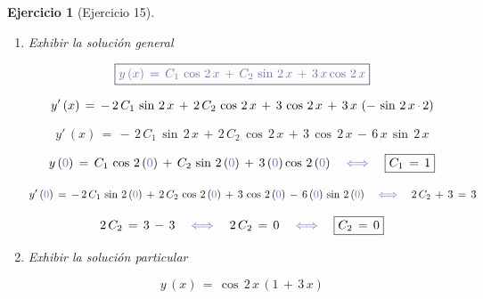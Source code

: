 \documentclass[a4paper,11pt, openany]{book}
\newtheorem{ejer}{Ejercicio}[section]
\newcommand*{\itembolasazules}[1]{%
\footnotesize\protect\tikz[baseline=-3pt]%
\protect\node[scale=.7, circle, shade, ball
color=green]{\color{white}\Large\bf#1};}
\begin{document}
\begin{ejer}[Ejercicio 15]
\begin{enumerate}[label=\itembolasazules{\arabic*}]
\begin{multline*}
4\,M\,\cos\,2\,x\,-\,4\,N\,\sin\,2\,x\,-\,\cancel{4\,M\,x\,\sin\,2\,x}\,-\,\cancel{4\,N\,x\,\cos\,2\,x}\,+\, \\
\cancel{4\,M\,x\,\sin\,2\,x}\,+\,\cancel{4\,N\,x\,\cos\,2\,x}\,=\,-\,12\,\sin\,2\,x    
\end{multline*}
 
$$4\,M\,=\,0 \quad \quad \textcolor{toolbox}{\iff} \quad \boxed{M\,=\,0}$$
 
$$-\,4\,N\,=\,-\,12 \quad \textcolor{toolbox}{\iff} \quad N\,=\,\dfrac{-\,12}{-\,4} \quad \textcolor{toolbox}{\iff} \quad \boxed{N\,=\,3}$$
 
\item Exhibir la solución general 
 
$$\boxed{\textcolor{toolbox}{y\,(x)\,=\,C_{1}\,\cos\,2\,x\,+\,C_{2}\,\sin\,2\,x\,+\,3\,x\cos\,2\,x} } $$
 
$$y'\,(x)\,=\,-\,2\,C_{1}\,\sin\,2\,x\,+\,2\,C_{2}\,\cos\,2\,x\,+\,3\,\cos\,2\,x\,+\,3\,x\,\left(-\,\sin\,2\,x\,\textcolor{toolbox}{\cdot}\,2 \right) $$
 
$$\boxed{y'\,(x)\,=\,-\,2\,C_{1}\,\sin\,2\,x\,+\,2\,C_{2}\,\cos\,2\,x\,+\,3\,\cos\,2\,x\,-\,6\,x\,\sin\,2\,x }$$
 
$$y\,(\textcolor{toolbox}{0})\,=\,C_{1}\,\cos\,2\,(\textcolor{toolbox}{0})\,+\,C_{2}\,\sin\,2\,(\textcolor{toolbox}{0})\,+\,3\,(\textcolor{toolbox}{0})\cos\,2\,(\textcolor{toolbox}{0}) \quad \textcolor{toolbox}{\iff} \quad \boxed{C_{1}\,=\,1}$$
 
$$y'\,(\textcolor{toolbox}{0})\,=\,-\,2\,C_{1}\,\sin\,2\,(\textcolor{toolbox}{0})\,+\,2\,C_{2}\,\cos\,2\,(\textcolor{toolbox}{0})\,+\,3\,\cos\,2\,(\textcolor{toolbox}{0})\,-\,6\,(\textcolor{toolbox}{0})\,\sin\,2\,(\textcolor{toolbox}{0}) \quad \textcolor{toolbox}{\iff} \quad 2\,C_{2}\,+\,3\,=\,3$$
 
$$2\,C_{2}\,=\,3\,-\,3 \quad \textcolor{toolbox}{\iff} \quad 2\,C_{2}\,=\,0 \quad \textcolor{toolbox}{\iff} \quad \boxed{C_{2}\,=\,0}$$
 
\item Exhibir la solución particular
 
$$\boxed{y\,(x)\,=\,\cos\,2\,x\,\left(1\,+\,3\,x \right)}$$
 
\end{enumerate}

\end{ejer}
 
\end{document}
